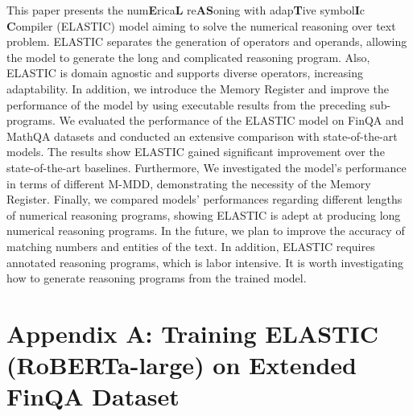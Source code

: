\documentclass{article}
\begin{document}
This paper presents the num\textbf{E}rica\textbf{L} re\textbf{AS}oning with adap\textbf{T}ive symbol\textbf{I}c \textbf{C}ompiler (ELASTIC) model aiming to solve the numerical reasoning over text problem. ELASTIC separates the generation of operators and operands, allowing the model to generate the long and complicated reasoning program. Also, ELASTIC is domain agnostic and supports diverse operators, increasing adaptability. In addition, we introduce the Memory Register and improve the performance of the model by using executable results from the preceding sub-programs. We evaluated the performance of the ELASTIC model on FinQA and MathQA datasets and conducted an extensive comparison with state-of-the-art models. The results show ELASTIC gained significant improvement over the state-of-the-art baselines. Furthermore, We investigated the model's performance in terms of different M-MDD, demonstrating the necessity of the Memory Register. Finally, we compared models' performances regarding different lengths of numerical reasoning programs, showing ELASTIC is adept at producing long numerical reasoning programs. In the future, we plan to improve the accuracy of matching numbers and entities of the text. In addition, ELASTIC requires annotated reasoning programs, which is labor intensive. It is worth investigating how to generate reasoning programs from the trained model.






\newpage

\section*{Appendix A: Training ELASTIC (RoBERTa-large) on Extended FinQA Dataset}
\label{appendix:a}
\end{document}
